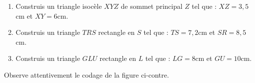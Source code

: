 \documentclass[a4paper,10pt]{report}
\begin{document}
\vspace{-1mm}
\begin{ex}

\medskip
\begin{enumerate}[font=\color{exer1}]
\item Construis un triangle isocèle $XYZ$ de sommet principal $Z$ tel que : $XZ=3,5$cm et $XY=6$cm.
\item Construis un triangle $TRS$ rectangle en $S$ tel que : $TS=7,2$cm et $SR=8,5$cm.
\item Construis un triangle $GLU$ rectangle en $L$ tel que : $LG=8$cm et $GU=10$cm.
\end{enumerate}
\end{ex}

\begin{ex}

\vspace{-10mm}
\noindent \begin{minipage}{9cm}

\vspace{5mm}
Observe attentivement le codage de la figure ci-contre.\medskip


\end{minipage}
\end{ex}
\end{document}
